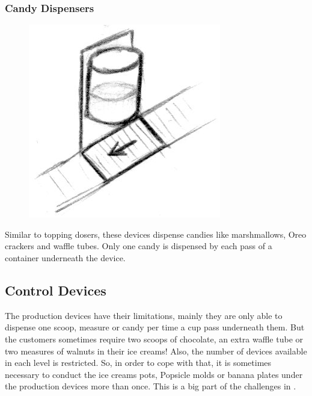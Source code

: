 \documentclass[a4paper]{scrartcl}
\begin{document}
        \subsubsection{Candy Dispensers}
            \begin{minipage}[t][6em][t]{\textwidth}
                \begin{figure}
                    \vspace{-20pt}
                    \includegraphics[scale=1]{devices/special_topping_doser}
                    \vspace{-20pt}
                \end{figure}

                Similar to topping dosers, these devices dispense candies like marshmallows, Oreo crackers and waffle tubes. Only one candy is dispensed by each pass of a container underneath the device.
            \end{minipage}

    \subsection{Control Devices}
    	The production devices have their limitations, mainly they are only able to dispense one scoop, measure or candy per time a cup pass underneath them. But the customers sometimes require two scoops of chocolate, an extra waffle tube or two measures of walnuts in their ice creams! Also, the number of devices available in each level is restricted. So, in order to cope with that, it is sometimes necessary to conduct the ice creams pots, Popsicle molds or banana plates under the production devices more than once. This is a big part of the challenges in \gamename.
    	
\end{document}
